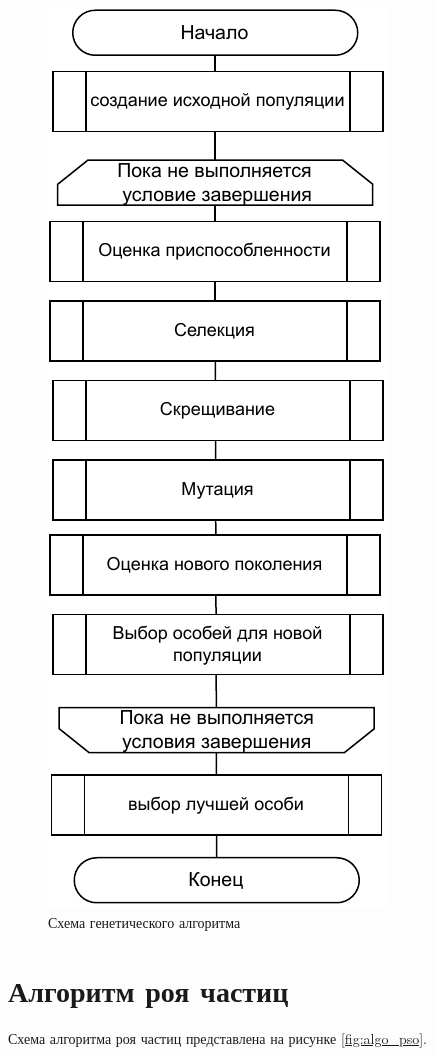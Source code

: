 \documentclass[12pt]{report}
\begin{document}
\begin{figure}[h!]
  \centering
  \includegraphics[scale = 0.9]{algo_gen.pdf}
  \caption{Схема генетического алгоритма}
  \label{fig:algo_gen}
\end{figure}

\section{Алгоритм роя частиц}
Схема алгоритма роя частиц представлена на рисунке \ref{fig:algo_pso}.
\end{document}
